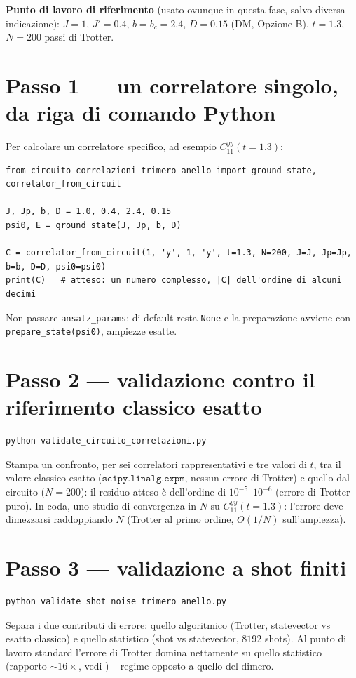 \documentclass[11pt,a4paper]{article}
\begin{document}
\textbf{Punto di lavoro di riferimento} (usato ovunque in questa fase, salvo
diversa indicazione): $J=1$, $J'=0.4$, $b=b_c=2.4$, $D=0.15$ (DM, Opzione B),
$t=1.3$, $N=200$ passi di Trotter.

\section*{Passo 1 --- un correlatore singolo, da riga di comando Python}

Per calcolare un correlatore specifico, ad esempio $C_{11}^{yy}(t{=}1.3)$:
\begin{verbatim}
from circuito_correlazioni_trimero_anello import ground_state, correlator_from_circuit

J, Jp, b, D = 1.0, 0.4, 2.4, 0.15
psi0, E = ground_state(J, Jp, b, D)

C = correlator_from_circuit(1, 'y', 1, 'y', t=1.3, N=200, J=J, Jp=Jp, b=b, D=D, psi0=psi0)
print(C)   # atteso: un numero complesso, |C| dell'ordine di alcuni decimi
\end{verbatim}
Non passare \texttt{ansatz\_params}: di default resta \texttt{None} e la
preparazione avviene con \texttt{prepare\_state(psi0)}, ampiezze esatte.

\section*{Passo 2 --- validazione contro il riferimento classico esatto}

\begin{verbatim}
python validate_circuito_correlazioni.py
\end{verbatim}
Stampa un confronto, per sei correlatori rappresentativi e tre valori di $t$,
tra il valore classico esatto ($\texttt{scipy.linalg.expm}$, nessun errore di
Trotter) e quello dal circuito ($N=200$): il residuo atteso è dell'ordine di
$10^{-5}$--$10^{-6}$ (errore di Trotter puro). In coda, uno studio di
convergenza in $N$ su $C_{11}^{yy}(t{=}1.3)$: l'errore deve dimezzarsi
raddoppiando $N$ (Trotter al primo ordine, $O(1/N)$ sull'ampiezza).

\section*{Passo 3 --- validazione a shot finiti}

\begin{verbatim}
python validate_shot_noise_trimero_anello.py
\end{verbatim}
Separa i due contributi di errore: quello algoritmico (Trotter, statevector
vs esatto classico) e quello statistico (shot vs statevector, $8192$ shots).
Al punto di lavoro standard l'errore di Trotter domina nettamente su quello
statistico (rapporto $\sim16\times$, vedi
\texttt{}) --
regime opposto a quello del dimero.
\end{document}
